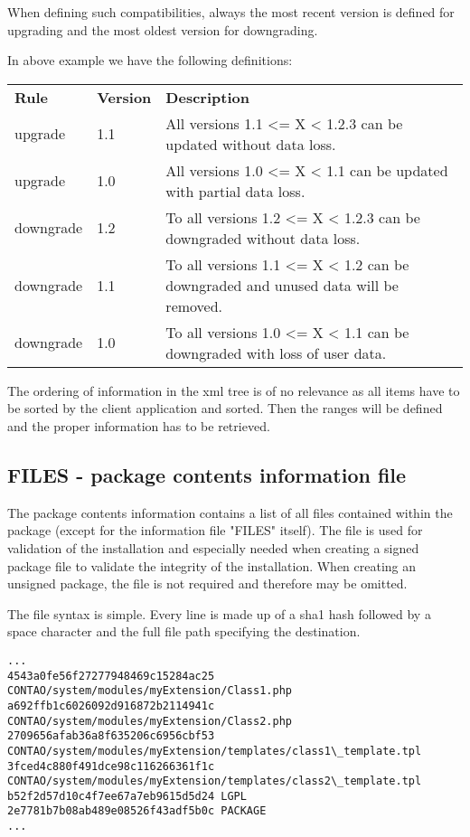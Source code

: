 When defining such compatibilities, always the most recent version is defined for upgrading and the most oldest version for downgrading.

In above example we have the following definitions:
\begin{tabular}{llp{}}\\
\textbf{Rule} & \textbf{Version} & \textbf{Description}\\
upgrade & 1.1 & All versions 1.1 <= X < 1.2.3 can be updated without data loss. \\
upgrade & 1.0 & All versions 1.0 <= X < 1.1 can be updated with partial data loss. \\
downgrade & 1.2 & To all versions 1.2 <= X < 1.2.3 can be downgraded without data loss. \\
downgrade & 1.1 & To all versions 1.1 <= X < 1.2 can be downgraded and unused data will be removed. \\
downgrade & 1.0 & To all versions 1.0 <= X < 1.1 can be downgraded with loss of user data. \\
\end{tabular}
The ordering of information in the xml tree is of no relevance as all items have to be sorted by the client application and sorted. Then the ranges will be defined and the proper information has to be retrieved.

\subsection[sec:files information file]{FILES - package contents information file}
The package contents information contains a list of all files contained within the package (except for the information file "FILES" itself).
The file is used for validation of the installation and especially needed when creating a signed package file to validate the integrity of the installation.
When creating an unsigned package, the file is not required and therefore may be omitted.

The file syntax is simple.
Every line is made up of a sha1 hash followed by a space character and the full file path specifying the destination.

\lstset{language=XML} 
\begin{lstlisting}[caption=FILES example: package contents information file]
...
4543a0fe56f27277948469c15284ac25 CONTAO/system/modules/myExtension/Class1.php
a692ffb1c6026092d916872b2114941c CONTAO/system/modules/myExtension/Class2.php
2709656afab36a8f635206c6956cbf53 CONTAO/system/modules/myExtension/templates/class1\_template.tpl
3fced4c880f491dce98c116266361f1c CONTAO/system/modules/myExtension/templates/class2\_template.tpl
b52f2d57d10c4f7ee67a7eb9615d5d24 LGPL
2e7781b7b08ab489e08526f43adf5b0c PACKAGE
...
\end{lstlisting}

